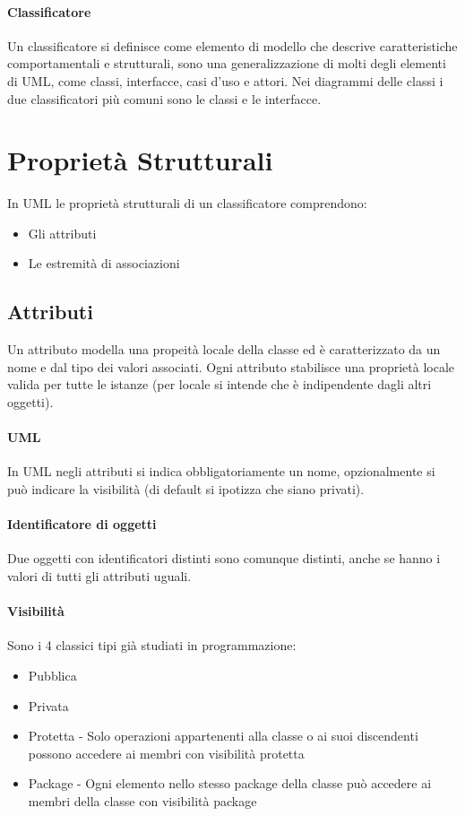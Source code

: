 \paragraph*{Classificatore} Un classificatore si definisce come elemento di modello
che descrive caratteristiche comportamentali e strutturali, sono una generalizzazione
di molti degli elementi di UML, come classi, interfacce, casi d'uso e attori.
Nei diagrammi delle classi i due classificatori più comuni sono le classi e le
interfacce.
\section{Proprietà Strutturali}
In UML le proprietà strutturali di un classificatore comprendono:
\begin{itemize}
    \item Gli attributi
    \item Le estremità di associazioni
\end{itemize}
\subsection{Attributi}
Un attributo modella una propeità locale della classe ed è caratterizzato da un nome
e dal tipo dei valori associati. Ogni attributo stabilisce una proprietà locale valida per
tutte le istanze (per locale si intende che è indipendente dagli altri oggetti).
\paragraph*{UML} In UML negli attributi si indica obbligatoriamente un nome, opzionalmente
si può indicare la visibilità (di default si ipotizza che siano privati).
\paragraph*{Identificatore di oggetti} Due oggetti con identificatori distinti sono
comunque distinti, anche se hanno i valori di tutti gli attributi uguali.
\paragraph*{Visibilità} Sono i 4 classici tipi già studiati in programmazione:
\begin{itemize}
    \item Pubblica
    \item Privata
    \item Protetta - Solo operazioni appartenenti alla classe o ai suoi discendenti possono
    accedere ai membri con visibilità protetta
    \item Package - Ogni elemento nello stesso package della classe può accedere ai membri
    della classe con visibilità package
\end{itemize}
